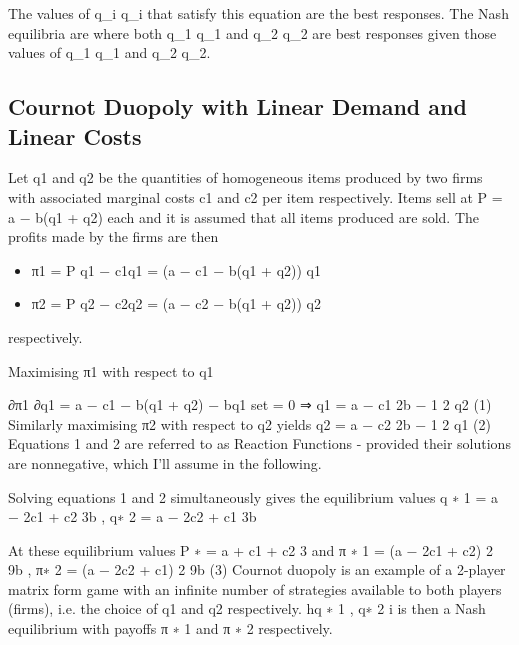 The values of {\displaystyle q_{i}} q_{i} that satisfy this equation are the best responses. The Nash equilibria are where both {\displaystyle q_{1}} q_{1} and {\displaystyle q_{2}} q_{2} are best responses given those values of {\displaystyle q_{1}} q_{1} and {\displaystyle q_{2}} q_{2}.

\subsection{Cournot Duopoly with Linear Demand and Linear Costs}
Let q1 and q2 be the quantities of homogeneous items produced by two firms with associated
marginal costs c1 and c2 per item respectively.
Items sell at P = a − b(q1 + q2) each and it is assumed that all items produced are sold.
The profits made by the firms are then
\begin{itemize}
\item π1 = P q1 − c1q1 = (a − c1 − b(q1 + q2)) q1
\item π2 = P q2 − c2q2 = (a − c2 − b(q1 + q2)) q2
\end{itemize}
respectively.


Maximising π1 with respect to q1

∂π1
∂q1
= a − c1 − b(q1 + q2) − bq1
set = 0
⇒ q1 =
a − c1
2b
−
1
2
q2 (1)
Similarly maximising π2 with respect to q2 yields
q2 =
a − c2
2b
−
1
2
q1 (2)
Equations 1 and 2 are referred to as Reaction Functions - provided their solutions are
nonnegative, which I’ll assume in the following.

Solving equations 1 and 2 simultaneously gives the equilibrium values
q
∗
1 =
a − 2c1 + c2
3b
, q∗
2 =
a − 2c2 + c1
3b

At these equilibrium values
P
∗ =
a + c1 + c2
3
and
π
∗
1 =
(a − 2c1 + c2)
2
9b
, π∗
2 =
(a − 2c2 + c1)
2
9b
(3)
Cournot duopoly is an example of a 2-player matrix form game with an infinite number
of strategies available to both players (firms), i.e. the choice of q1 and q2 respectively.
hq
∗
1
, q∗
2
i is then a Nash equilibrium with payoffs π
∗
1
and π
∗
2
respectively.

